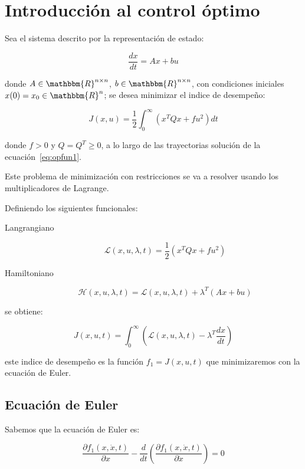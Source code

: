 \chapter{Introducción al control óptimo}

    Sea el sistema descrito por la representación de estado:

    \begin{equation} \label{eq:conop1}
        \frac{dx}{dt} = A x + b u
    \end{equation}

    donde $A \in \mathbbm{R}^{n \times n}$, $b \in \mathbbm{R}^{n \times n}$, con condiciones iniciales $x(0) = x_0 \in \mathbbm{R}^n$; se desea minimizar el indice de desempeño:

    \begin{equation}
        J(x, u) = \frac{1}{2} \int_0^{\infty} \left( x^T Q x + f u^2 \right) dt
    \end{equation}

    donde $f > 0$ y $Q = Q^T \ge 0$, a lo largo de las trayectorias solución de la ecuación~\ref{eq:opfun1}.

    Este problema de minimización con restricciones se va a resolver usando los multiplicadores de Lagrange.

    Definiendo los siguientes funcionales:

    \begin{description}
        \item [Langrangiano]
        \begin{equation}
            \mathscr{L}(x, u, \lambda, t) = \frac{1}{2} \left( x^T Q x + f u^2 \right)
        \end{equation}
        \item [Hamiltoniano]
        \begin{equation}
            \mathscr{H}(x, u, \lambda, t) = \mathscr{L}(x, u, \lambda, t) + \lambda^T (A x + b u)
        \end{equation}
    \end{description}

    se obtiene:

    \begin{equation}
        J(x, u, t) = \int_0^{\infty} \left( \mathscr{L}(x, u, \lambda, t) - \lambda^T \frac{dx}{dt} \right)
    \end{equation}

    este indice de desempeño es la función $f_1 = J(x, u, t)$ que minimizaremos con la ecuación de Euler.

    \newpage
    \section{Ecuación de Euler}

        Sabemos que la ecuación de Euler es:

        \begin{equation}
            \frac{\partial f_1(x, \dot{x}, t)}{\partial x} - \frac{d}{dt} \left( \frac{\partial f_1(x, \dot{x}, t)}{\partial \dot{x}} \right) = 0
        \end{equation}

        
